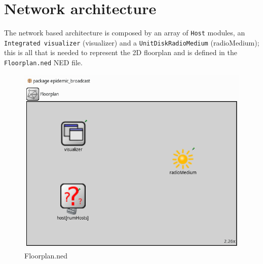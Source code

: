 \section{Network architecture}
The network based architecture is composed by an array of \texttt{Host} modules,
an \texttt{Integrated visualizer} (visualizer) and a \texttt{UnitDiskRadioMedium}
(radioMedium); this is all that is needed to represent the 2D floorplan and
is defined in the \texttt{Floorplan.ned} NED file.
\begin{figure}[H]
    \begin{center}
        \includegraphics[scale=0.35]{img/floorplan.png}
        \caption{Floorplan.ned}
        \label{fig:floorplanOmnet}
    \end{center}
    \vspace*{-0.8cm}
\end{figure}
